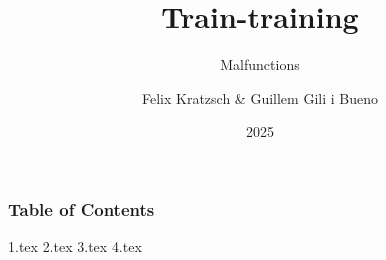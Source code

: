 \documentclass{beamer}
\title{Train-training}
\subtitle{Malfunctions}
\author{Felix  Kratzsch \& Guillem Gili i Bueno  }
\institute{Potsdam University - Railway Scheudling }
\date{2025}
\begin{document}
\frame{\titlepage}

\begin{frame}[label=toc]
\frametitle{Table of Contents}
\tableofcontents[]
\end{frame} 


{1.tex}
{2.tex}
{3.tex}
{4.tex}
\end{document}
